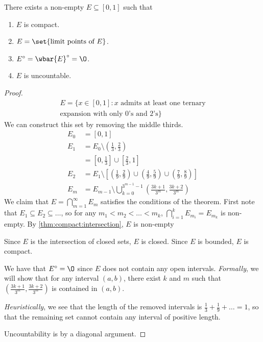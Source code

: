 \begin{theorem*} \label{thm:cantor_set}
    There exists a non-empty $E \subseteq [0, 1]$ such that
    \begin{enumerate}
        \item $E$ is compact.
        \item $E = \set{\text{limit points of } E}$.
        \item $E^\circ = \wbar{E}^\circ = \O$.
        \item $E$ is uncountable.
    \end{enumerate}
\end{theorem*}
\begin{proof}
    \begin{align*}
        E = \{x \in [0, 1] : x \text{ admits at least one ternary} \\
        \text{expansion with only $0$'s and $2$'s}\}
    \end{align*}
    We can construct this set by removing the middle thirds.
    \begin{align*}
        E_0 &= [0, 1] \\
        E_1 &= E_0 \setminus \left(\frac13, \frac23\right) \\
           &= \left[0, \frac13\right] \cup \left[\frac23, 1\right] \\
        E_2 &= E_1 \setminus \left[\left(\frac19, \frac29\right) \cup
            \left(\frac49, \frac59\right) \cup \left(\frac79, \frac89\right)\right] \\
        E_m &= E_{m-1} \setminus \bigcup_{k=0}^{3^{m-1} - 1}
            \left(\frac{3k + 1}{3^m}, \frac{3k + 2}{3^m}\right)
    \end{align*}
    We claim that $E = \bigcap_{m=1}^\infty E_m$ satisfies the conditions of
    the theorem.
    First note that $E_1 \subseteq E_2 \subseteq \dots$,
    so for any $m_1 < m_2 < \dots < m_k$,
    $\bigcap_{i = 1}^k E_{m_i} = E_{m_k}$ is non-empty.
    By \cref{thm:compact:intersection}, $E$ is non-empty

    Since $E$ is the intersection of closed sets, $E$ is closed.
    Since $E$ is bounded, $E$ is compact.

    We have that $E^\circ = \O$ since $E$ does not contain any open
    intervals.
    \emph{Formally}, we will show that for any interval $(a, b)$, there
    exist $k$ and $m$ such that $\left(\frac{3k+1}{3^m}, \frac{3k+2}{3^m}
    \right)$ is contained in $(a, b)$. %

    \emph{Heuristically}, we see that the length of the removed intervals
    is $\frac13 + \frac19 + \dots = 1$, so that the remaining set cannot
    contain any interval of positive length.

    Uncountability is by a diagonal argument.
\end{proof}
